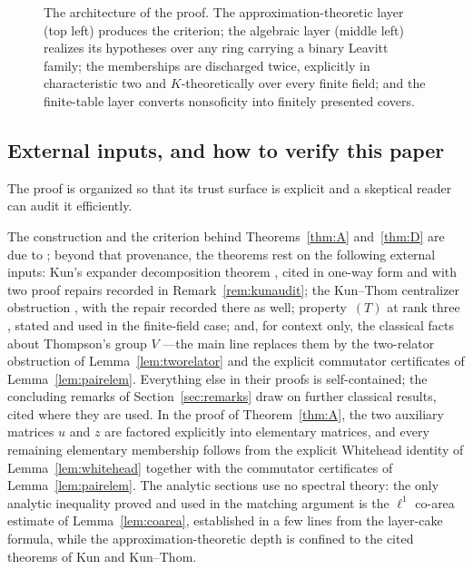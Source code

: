 \documentclass[11pt]{amsart}
\theoremstyle{definition}
\theoremstyle{plain}
\begin{document}
\begin{figure}[t]
\caption{The architecture of the proof.  The approximation-theoretic layer (top left) produces the criterion; the algebraic layer (middle left) realizes its hypotheses over any ring carrying a binary Leavitt family; the memberships are discharged twice, explicitly in characteristic two and $K$-theoretically over every finite field; and the finite-table layer converts nonsoficity into finitely presented covers.}
\label{fig:architecture}
\end{figure}

\subsection*{External inputs, and how to verify this paper}

The proof is organized so that its trust surface is explicit and a skeptical reader can audit it efficiently.

The construction and the criterion behind Theorems~\ref{thm:A} and~\ref{thm:D} are due to \cite{OpenAI26}; beyond that provenance, the theorems rest on the following external inputs: Kun's expander decomposition theorem \cite{Kun19}, cited in one-way form and with two proof repairs recorded in Remark~\ref{rem:kunaudit}; the Kun--Thom centralizer obstruction \cite{KunThom19}, with the repair recorded there as well; property~\((T)\) at rank three \cite{ErshovJaikin10}, stated and used in the finite-field case; and, for context only, the classical facts about Thompson's group \(V\) \cite{Higman74,CannonFloydParry96,BleakQuick17}---the main line replaces them by the two-relator obstruction of Lemma~\ref{lem:tworelator} and the explicit commutator certificates of Lemma~\ref{lem:pairelem}.  Everything else in their proofs is self-contained; the concluding remarks of Section~\ref{sec:remarks} draw on further classical results, cited where they are used.  In the proof of Theorem~\ref{thm:A}, the two auxiliary matrices \(u\) and \(z\) are factored explicitly into elementary matrices, and every remaining elementary membership follows from the explicit Whitehead identity of Lemma~\ref{lem:whitehead} together with the commutator certificates of Lemma~\ref{lem:pairelem}.  The analytic sections use no spectral theory: the only analytic inequality proved and used in the matching argument is the \(\ell^1\) co-area estimate of Lemma~\ref{lem:coarea}, established in a few lines from the layer-cake formula, while the approximation-theoretic depth is confined to the cited theorems of Kun and Kun--Thom.
\end{document}
